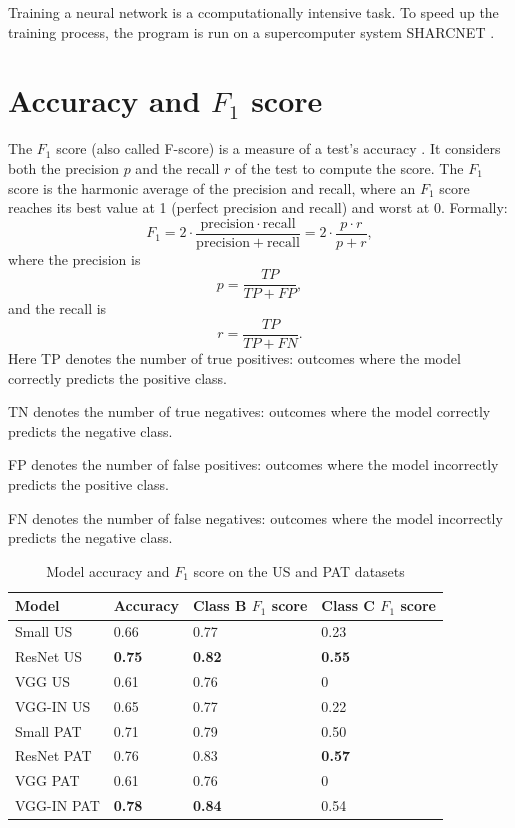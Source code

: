 Training a neural network is a ccomputationally intensive task. To speed up the training process, the program is run on a supercomputer system SHARCNET \citep{sharcnet}.

\section{Accuracy and $F_1$ score}
\label{result_acc}

The $F_1$ score (also called F-score) is a measure of a test's accuracy \citep{powers2011evaluation}. It considers both the precision $p$ and the recall $r$ of the test to compute the score. The $F_1$ score is the harmonic average of the precision and recall, where an $F_1$ score reaches its best value at 1 (perfect precision and recall) and worst at 0.
Formally: 
\begin{equation}\label{f1_score}
    F_1 = 2 \cdot \frac{\mathrm{precision} \cdot \mathrm{recall}}{\mathrm{precision} + \mathrm{recall}} = 2 \cdot \frac{p \cdot r}{p+r},
\end{equation}
where the precision is $$p = \frac{TP}{TP + FP},$$
and the recall is $$r = \frac{TP}{TP + FN}.$$
\noindent Here TP denotes the number of true positives: outcomes where the model correctly predicts the positive class.

\noindent TN denotes the number of true negatives: outcomes where the model correctly predicts the negative class.

\noindent FP denotes the number of false positives: outcomes where the model incorrectly predicts the positive class.

\noindent FN denotes the number of false negatives: outcomes where the model incorrectly predicts the negative class.

\begin{table}[h]
\centering
\begin{tabular}{ |p{4cm}||p{3cm}|p{3cm}|p{3cm}|  }
 \hline
 Model       & Accuracy & Class B $F_1$ score & Class C $F_1$ score\\
 \hline
 \hline
 Small  US   & 0.66  & 0.77 &  0.23\\
 ResNet US   & \textbf{0.75}  & \textbf{0.82} &  \textbf{0.55}\\
 VGG US      & 0.61  & 0.76 &  0\\
 VGG-IN US & 0.65 & 0.77 & 0.22 \\
\hline
 Small PAT   & 0.71  & 0.79 &  0.50\\
 ResNet PAT  & 0.76  & 0.83 &  \textbf{0.57}\\
 VGG PAT     & 0.61  & 0.76 &  0\\
 VGG-IN PAT & \textbf{0.78} & \textbf{0.84} & 0.54 \\
 \hline
\end{tabular}
\caption{Model accuracy and $F_1$ score on the US and PAT datasets}
\label{acctable}
\end{table}

